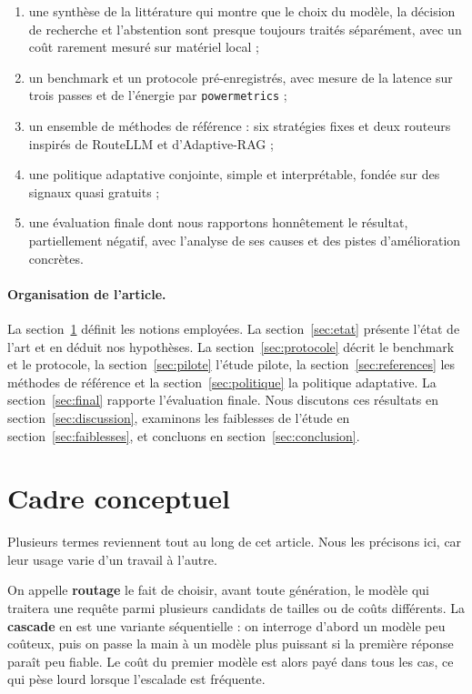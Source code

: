 \documentclass[11pt,a4paper]{article}
\begin{document}
\begin{enumerate}
\item une synthèse de la littérature qui montre que le choix du modèle, la décision de recherche et
l'abstention sont presque toujours traités séparément, avec un coût rarement mesuré sur matériel local ;
\item un benchmark et un protocole pré-enregistrés, avec mesure de la latence sur trois passes et de
l'énergie par \texttt{powermetrics} ;
\item un ensemble de méthodes de référence : six stratégies fixes et deux routeurs inspirés de RouteLLM
et d'Adaptive-RAG ;
\item une politique adaptative conjointe, simple et interprétable, fondée sur des signaux quasi gratuits ;
\item une évaluation finale dont nous rapportons honnêtement le résultat, partiellement négatif, avec
l'analyse de ses causes et des pistes d'amélioration concrètes.
\end{enumerate}

\paragraph{Organisation de l'article.} La section~\ref{sec:cadre} définit les notions employées. La
section~\ref{sec:etat} présente l'état de l'art et en déduit nos hypothèses. La
section~\ref{sec:protocole} décrit le benchmark et le protocole, la section~\ref{sec:pilote} l'étude
pilote, la section~\ref{sec:references} les méthodes de référence et la section~\ref{sec:politique} la
politique adaptative. La section~\ref{sec:final} rapporte l'évaluation finale. Nous discutons ces
résultats en section~\ref{sec:discussion}, examinons les faiblesses de l'étude en
section~\ref{sec:faiblesses}, et concluons en section~\ref{sec:conclusion}.

\section{Cadre conceptuel}\label{sec:cadre}

Plusieurs termes reviennent tout au long de cet article. Nous les précisons ici, car leur usage varie
d'un travail à l'autre.

On appelle \textbf{routage} le fait de choisir, avant toute génération, le modèle qui traitera une
requête parmi plusieurs candidats de tailles ou de coûts différents. La \textbf{cascade} en est une
variante séquentielle : on interroge d'abord un modèle peu coûteux, puis on passe la main à un modèle
plus puissant si la première réponse paraît peu fiable. Le coût du premier modèle est alors payé dans
tous les cas, ce qui pèse lourd lorsque l'escalade est fréquente.
\end{document}
